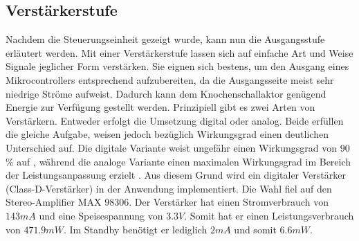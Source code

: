\subsection{Verstärkerstufe} \label{sec:verstaerkerstufe}
Nachdem die Steuerungseinheit gezeigt wurde, kann nun die Ausgangsstufe erläutert werden. Mit einer Verstärkerstufe lassen sich auf einfache Art und Weise Signale jeglicher Form verstärken. Sie eignen sich bestens, um den Ausgang eines Mikrocontrollers entsprechend aufzubereiten, da die Ausgangsseite meist sehr niedrige Ströme aufweist. Dadurch kann dem Knochenschallaktor genügend Energie zur Verfügung gestellt werden. Prinzipiell gibt es zwei Arten von Verstärkern. Entweder erfolgt die Umsetzung digital oder analog. Beide erfüllen die gleiche Aufgabe, weisen jedoch bezüglich Wirkungsgrad einen deutlichen Unterschied auf. Die digitale Variante weist ungefähr einen Wirkungsgrad von 90$\%$ auf \cite{BoneConductorAdafruit}, während die analoge Variante einen maximalen Wirkungsgrad im Bereich der Leistungsanpassung erzielt \cite{Niklaus_Skript}. Aus diesem Grund wird ein digitaler Verstärker (Class-D-Verstärker) in der Anwendung implementiert. Die Wahl fiel auf den Stereo-Amplifier MAX 98306. Der Verstärker hat einen Stromverbrauch von $143mA$ und eine Speisespannung von $3.3V$. Somit hat er einen Leistungsverbrauch von $471.9 mW$. Im Standby benötigt er lediglich $2 mA$ und somit $6.6 mW$\cite{Verstaerker}.